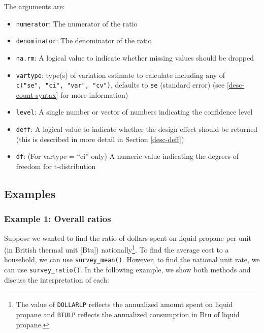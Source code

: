 \documentclass[
]{krantz}
\providecommand{\tightlist}{%
  \setlength{\itemsep}{0pt}\setlength{\parskip}{0pt}}
\begin{document}
The arguments are:

\begin{itemize}
\tightlist
\item
  \texttt{numerator}: The numerator of the ratio
\item
  \texttt{denominator}: The denominator of the ratio
\item
  \texttt{na.rm}: A logical value to indicate whether missing values should be dropped
\item
  \texttt{vartype}: type(s) of variation estimate to calculate including any of \texttt{c("se",\ "ci",\ "var",\ "cv")}, defaults to \texttt{se} (standard error) (see \ref{desc-count-syntax} for more information)
\item
  \texttt{level}: A single number or vector of numbers indicating the confidence level
\item
  \texttt{deff}: A logical value to indicate whether the design effect should be returned (this is described in more detail in Section \ref{desc-deff})
\item
  \texttt{df}: (For vartype = ``ci'' only) A numeric value indicating the degrees of freedom for t-distribution
\end{itemize}

\hypertarget{examples-4}{%
\subsection{Examples}\label{examples-4}}

\hypertarget{example-1-overall-ratios}{%
\subsubsection*{Example 1: Overall ratios}\label{example-1-overall-ratios}}


Suppose we wanted to find the ratio of dollars spent on liquid propane per unit (in British thermal unit {[}Btu{]}) nationally\footnote{The value of \texttt{DOLLARLP} reflects the annualized amount spent on liquid propane and \texttt{BTULP} reflects the annualized consumption in Btu of liquid propane.}. To find the average cost to a household, we can use \texttt{survey\_mean()}. However, to find the national unit rate, we can use \texttt{survey\_ratio()}. In the following example, we show both methods and discuss the interpretation of each:
\end{document}
